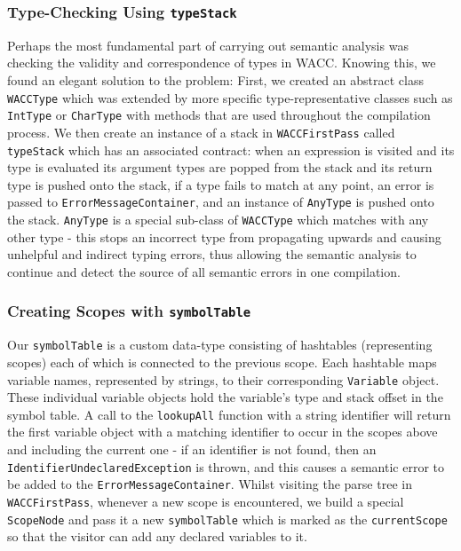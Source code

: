 \documentclass[a4wide, 10pt]{article}
\begin{document}
\subsubsection*{Type-Checking Using \texttt{typeStack}}
Perhaps the most fundamental part of carrying out semantic analysis was checking the validity and correspondence of types in WACC. Knowing this, we found an elegant solution to the problem: First, we created an abstract class \texttt{WACCType} which was extended by more specific type-representative classes such as \texttt{IntType} or \texttt{CharType} with methods that are used throughout the compilation process. We then create an instance of a stack in \texttt{WACCFirstPass} called \texttt{typeStack} which has an associated contract: when an expression is visited and its type is evaluated its argument types are popped from the stack and its return type is pushed onto the stack, if a type fails to match at any point, an error is passed to \texttt{ErrorMessageContainer}, and an instance of \texttt{AnyType} is pushed onto the stack. \texttt{AnyType} is a special sub-class of \texttt{WACCType} which matches with any other type - this stops an incorrect type from propagating upwards and causing unhelpful and indirect typing errors, thus allowing the semantic analysis to continue and detect the source of all semantic errors in one compilation. 
 
\subsubsection*{Creating Scopes with \texttt{symbolTable}}
Our \texttt{symbolTable} is a custom data-type consisting of hashtables (representing scopes) each of which is connected to the previous scope. Each hashtable maps variable names, represented by strings, to their corresponding \texttt{Variable} object. These individual variable objects hold the variable's type and stack offset in the symbol table. A call to the \texttt{lookupAll} function with a string identifier will return the first variable object with a matching identifier to occur in the scopes above and including the current one - if an identifier is not found, then an \texttt{IdentifierUndeclaredException} is thrown, and this causes a semantic error to be added to the \texttt{ErrorMessageContainer}. Whilst visiting the parse tree in \texttt{WACCFirstPass}, whenever a new scope is encountered, we build a special \texttt{ScopeNode} and pass it a new \texttt{symbolTable} which is marked as the \texttt{currentScope} so that the visitor can add any declared variables to it. 
\end{document}
